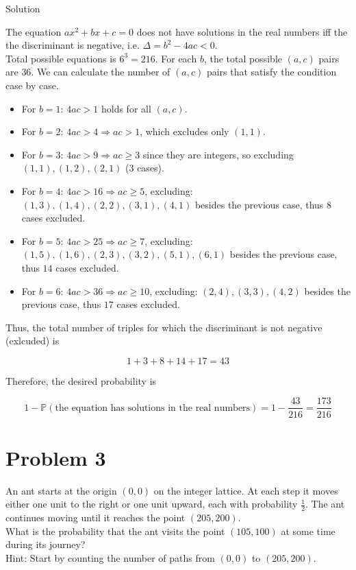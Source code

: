 \documentclass{qlnotes-export}
\begin{document}
\begin{qlsolution}{Solution}

The equation \(ax^{2} + bx + c = 0\) does not have solutions in the real numbers iff the the discriminant is negative, i.e. \(\Delta = b^{2} - 4ac < 0\).\\
Total possible equations is \(6^{3} = 216\). For each \(b\), the total possible \((a,c)\) pairs are \(36\). We can calculate the number of \((a,c)\) pairs that satisfy the condition case by case.

\begin{itemize}
\item
  For \(b = 1\): \(4ac > 1\) holds for all \((a,c)\).
\item
  For \(b = 2\): \(4ac > 4\Longrightarrow ac > 1\), which excludes only \((1,1)\).
\item
  For \(b = 3\): \(4ac > 9\Longrightarrow ac \geq 3\) since they are integers, so excluding \((1,1),(1,2),(2,1)\) (\(3\) cases).
\item
  For \(b = 4\): \(4ac > 16\Longrightarrow ac \geq 5\), excluding: \((1,3),(1,4),(2,2),(3,1),(4,1)\) besides the previous case, thus \(8\) cases excluded.
\item
  For \(b = 5\): \(4ac > 25\Longrightarrow ac \geq 7\), excluding: \((1,5),(1,6),(2,3),(3,2),(5,1),(6,1)\) besides the previous case, thus \(14\) cases excluded.
\item
  For \(b = 6\): \(4ac > 36\Longrightarrow ac \geq 10\), excluding: \((2,4),(3,3),(4,2)\) besides the previous case, thus \(17\) cases excluded.
\end{itemize}

Thus, the total number of triples for which the discriminant is not negative (exlcuded) is

\[1 + 3 + 8 + 14 + 17 = 43\]

Therefore, the desired probability is

\[1 - {\mathbb{P}}(\text{the equation has solutions in the real numbers}) = 1 - \frac{43}{216} = \frac{173}{216}\]

\end{qlsolution}

\section{Problem 3}\label{problem-3-1}

An ant starts at the origin \((0,0)\) on the integer lattice. At each step it moves either one unit to the right or one unit upward, each with probability \(\frac{1}{2}\). The ant continues moving until it reaches the point \((205,200)\).\\
What is the probability that the ant visits the point \((105,100)\) at some time during its journey?\\
Hint: Start by counting the number of paths from \((0,0)\) to \((205,200)\).
\end{document}
